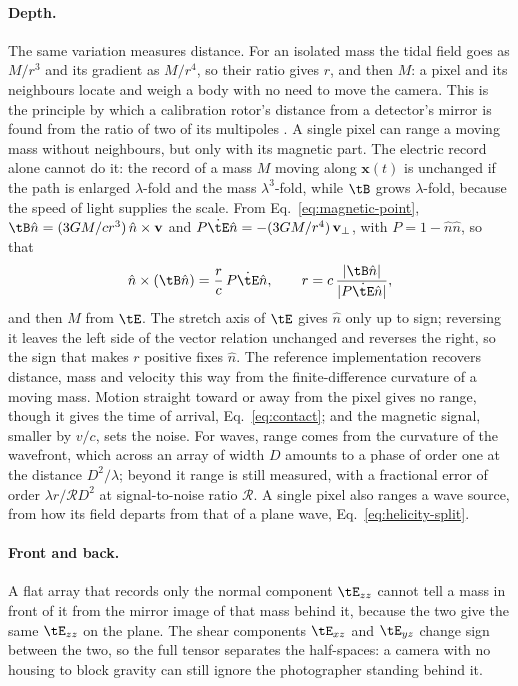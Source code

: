 \paragraph{Depth.} The same variation measures distance. For an isolated mass
the tidal field goes as $M/r^{3}$ and its gradient as $M/r^{4}$, so their
ratio gives $r$, and then $M$: a pixel and its neighbours locate and weigh a
body with no need to move the camera. This is the principle by which a
calibration rotor's distance from a detector's mirror is found from the ratio
of two of its multipoles \cite{Inoue2018}. A single pixel can range a moving
mass without neighbours, but only with its magnetic part. The electric record
alone cannot do it: the record of a mass $M$ moving along $\mathbf{x}(t)$ is
unchanged if the path is enlarged $\lambda$-fold and the mass
$\lambda^3$-fold, while $\tB$ grows $\lambda$-fold, because the speed of light
supplies the scale. From Eq.~\eqref{eq:magnetic-point}, $\tB\hat n =
(3GM/cr^3)\,\hat n\times\mathbf v$ and $P\dot{\tE}\hat n = -(3GM/r^4)\,\mathbf
v_\perp$, with $P = 1 - \hat n\hat n$, so that
\begin{equation}\label{eq:one-pixel-range}
\hat n\times(\tB\hat n) = \frac{r}{c}\,P\dot{\tE}\hat n ,
\qquad r = c\,\frac{|\tB\hat n|}{|P\dot{\tE}\hat n|} ,
\end{equation}
and then $M$ from $\tE$. The stretch axis of $\tE$ gives $\hat n$ only up to
sign; reversing it leaves the left side of the vector relation unchanged and
reverses the right, so the sign that makes $r$ positive fixes $\hat n$. The reference implementation recovers distance, mass and velocity
this way from the finite-difference curvature of a moving mass. Motion straight
toward or away from the pixel gives no range, though it gives the time of
arrival, Eq.~\eqref{eq:contact}; and the magnetic signal, smaller by $v/c$, sets
the noise. For waves, range comes from the curvature of the wavefront, which
across an array of width $D$ amounts to a phase of order one at the distance
$D^{2}/\lambda$; beyond it range is still measured, with a fractional error of
order $\lambda r/\mathcal{R}D^{2}$ at signal-to-noise ratio $\mathcal{R}$. A
single pixel also ranges a wave source, from how its field departs from that of
a plane wave, Eq.~\eqref{eq:helicity-split}.

\paragraph{Front and back.} A flat array that records only the normal
component $\tE_{zz}$ cannot tell a mass in front of it from the mirror image of
that mass behind it, because the two give the same $\tE_{zz}$ on the plane. The
shear components $\tE_{xz}$ and $\tE_{yz}$ change sign between the two, so the
full tensor separates the half-spaces: a camera with no housing to block
gravity can still ignore the photographer standing behind it.


